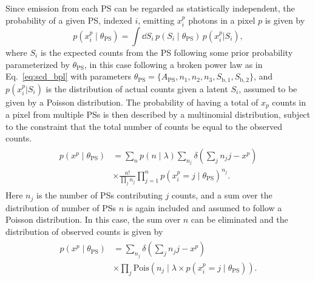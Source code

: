 \documentclass[prd,aps,10pt,nofootinbib,twocolumn,superscriptaddress,preprintnumbers,balancelastpage,longbibliography]{revtex4-1}
\begin{document}
 Since emission from each PS can be regarded as statistically independent, the probability of a given PS, indexed $i$, emitting $x^p_i$ photons in a pixel $p$ is given by
\begin{equation}
\label{eq:pixel-wise_likelihood}
p(x^p_i\mid\theta_\mathrm{PS}) = \int \dd S_i \,p(S_i\mid\theta_\mathrm{PS})\,p(x^p_i|S_i),
\end{equation}
where $S_i$ is the expected counts from the PS following some prior probability parameterized by $\theta_\mathrm{PS}$, in this case following a broken power law as in Eq.~\ref{eq:scd_bpl} with parameters $\theta_\mathrm{PS} = \{A_\mathrm{PS},  n_1, n_2, n_3, S_\mathrm{b,1}, S_\mathrm{b,2}\}$, and $p(x^p_i|S_i)$ is the distribution of actual counts given a latent $S_i$, assumed to be given by a Poisson distribution. The probability of having a total of $x_p$ counts in a pixel from multiple PSs is then described by a multinomial distribution, subject to the constraint that the total number of counts be equal to the observed counts.
\begin{align}
\label{eq:pixel-wise_likelihood_multinomial}
\begin{split}
p(x^p\mid\theta_\mathrm{PS}) &=  \sum_{n}  p\left(n \mid \lambda\right) \sum_{n_{j}} \delta\left(\sum_j n_{j}j - x^p\right) \\ 
&\times \frac{n!}{\prod_j n_{j} }\prod_{j=1}^{n} p(x^p_i = j\mid\theta_\mathrm{PS})  ^ {n_{j}}.
\end{split}
\end{align}
Here $n_j$ is the number of PSs contributing $j$ counts, and a sum over the distribution of number of PSs $n$ is again included and assumed to follow a Poisson distribution. In this case, the sum over $n$ can be eliminated and the distribution of observed counts is given by
\begin{align}
\label{eq:pixel-wise_likelihood_poisson}
\begin{split}
p(x^p\mid\theta_\mathrm{PS}) &= \sum_{n_j} \delta\left(\sum_j n_{j}j - x^p\right) \\ &\times \prod_j \mathrm{Pois}\left(n_{j}\mid\lambda \times p(x^p_i = j\mid\theta_\mathrm{PS})\right).
\end{split}
\end{align}
\end{document}
